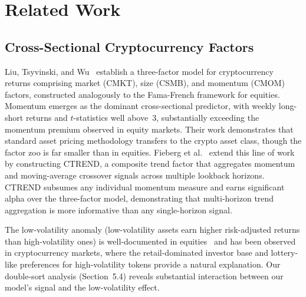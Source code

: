 \documentclass[sigconf]{acmart}
\begin{document}
%

\section{Related Work}

\subsection{Cross-Sectional Cryptocurrency Factors}

Liu, Tsyvinski, and Wu~\cite{liu2022} establish a three-factor model for cryptocurrency returns comprising market (CMKT), size (CSMB), and momentum (CMOM) factors, constructed analogously to the Fama-French framework for equities.
Momentum emerges as the dominant cross-sectional predictor, with weekly long-short returns and $t$-statistics well above~3, substantially exceeding the momentum premium observed in equity markets.
Their work demonstrates that standard asset pricing methodology transfers to the crypto asset class, though the factor zoo is far smaller than in equities.
Fieberg et al.~\cite{fieberg2024} extend this line of work by constructing CTREND, a composite trend factor that aggregates momentum and moving-average crossover signals across multiple lookback horizons.
CTREND subsumes any individual momentum measure and earns significant alpha over the three-factor model, demonstrating that multi-horizon trend aggregation is more informative than any single-horizon signal.

The low-volatility anomaly (low-volatility assets earn higher risk-adjusted returns than high-volatility ones) is well-documented in equities~\cite{ang2006} and has been observed in cryptocurrency markets, where the retail-dominated investor base and lottery-like preferences for high-volatility tokens provide a natural explanation.
Our double-sort analysis (Section~5.4) reveals substantial interaction between our model's signal and the low-volatility effect.
\end{document}
